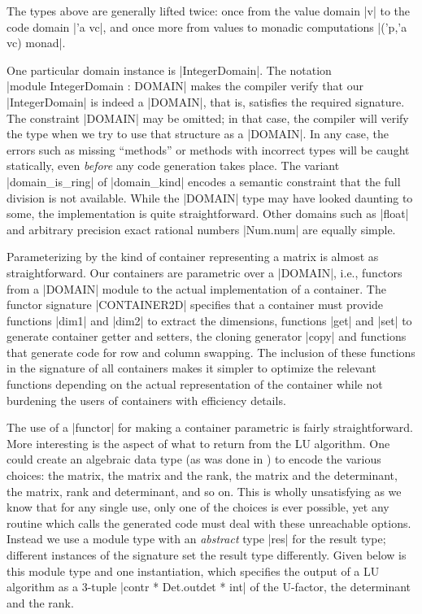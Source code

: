 \documentclass[draft]{elsart}
\begin{document}
\noindent  The types above are
generally lifted twice: once from the value domain |v| to the code
domain |'a vc|, and once more from values to monadic computations
|('p,'a vc) monad|. 

One particular domain instance is |IntegerDomain|. The notation\\
|module IntegerDomain : DOMAIN| makes the compiler verify that our
|IntegerDomain| is indeed a |DOMAIN|, that is, satisfies the required
signature. The constraint |DOMAIN| may be omitted; in that case, the
compiler will verify the type when we try to use that structure as a
|DOMAIN|. In any case, the errors such as missing ``methods'' or
methods with incorrect types will be caught statically, even
\emph{before} any code generation takes place. The variant
|domain_is_ring| of |domain_kind| encodes a semantic constraint 
that the full division
is not available. While the |DOMAIN| type may have looked daunting to
some, the implementation is quite straightforward.  Other domains such
as |float| and arbitrary precision exact rational numbers |Num.num|
are equally simple.

Parameterizing by the kind of container representing a matrix is
almost as straightforward.  Our containers are  parametric
over a |DOMAIN|, i.e., functors from a |DOMAIN| module
to the actual implementation of a container. The functor signature
|CONTAINER2D| specifies that a container must provide functions |dim1|
and |dim2| to extract the dimensions, functions |get| and |set| to
generate container getter and setters, the cloning generator |copy|
and functions that generate code for row and column swapping. The
inclusion of these functions in the signature of all containers makes
it simpler to optimize the relevant functions depending on the actual
representation of the container while not burdening the users of
containers with efficiency details. 

The use of a |functor| for making a container parametric is fairly
straightforward.  More interesting is the aspect of what to return
from the LU algorithm.  One could create an algebraic data type (as
was done in \cite{carette04}) to encode the various choices: the
matrix, the matrix and the rank, the matrix and the determinant, the
matrix, rank and determinant, and so on. This is wholly unsatisfying
as we know that for any single use, only one of the choices is ever
possible, yet any routine which calls the generated code must deal
with these unreachable options.  Instead we use a module type with an
\emph{abstract} type |res| for the result type; different instances of
the signature set the result type differently. Given below is this
module type and one instantiation, which specifies the output of a LU
algorithm as a 3-tuple |contr * Det.outdet * int| of the U-factor, the
determinant and the rank.
\end{document}
